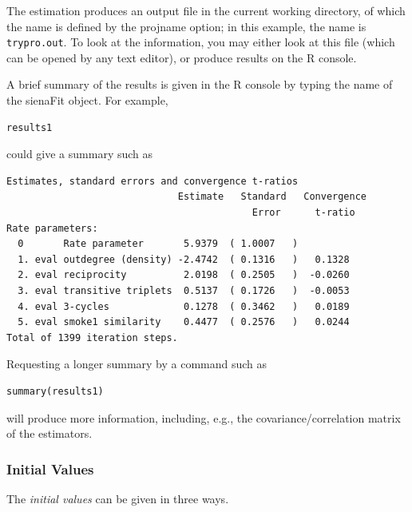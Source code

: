 \documentclass[a4paper,fleqn,11pt]{article}
\newcommand{\+}{\, + \,}
\newcommand{\R}{{\sf R }}
\begin{document}
{The estimation produces an output file in the current working directory,
of which the name is defined by the \textsf{projname} option;
in this example, the name is \texttt{trypro.out}.
To look at the information, you may either look at this file
(which can be opened by any text editor), or produce results on the \R console.

A brief summary of the results is given in the \R console by
typing the name of the  \textsf{sienaFit} object. For example,
\begin{verbatim}
results1
\end{verbatim}
could give a summary such as
\par
{\footnotesize
\begin{verbatim}
Estimates, standard errors and convergence t-ratios
                              Estimate   Standard   Convergence
                                           Error      t-ratio
Rate parameters:
  0       Rate parameter       5.9379  ( 1.0007   )
  1. eval outdegree (density) -2.4742  ( 0.1316   )   0.1328
  2. eval reciprocity          2.0198  ( 0.2505   )  -0.0260
  3. eval transitive triplets  0.5137  ( 0.1726   )  -0.0053
  4. eval 3-cycles             0.1278  ( 0.3462   )   0.0189
  5. eval smoke1 similarity    0.4477  ( 0.2576   )   0.0244
Total of 1399 iteration steps.
\end{verbatim}
}
Requesting a longer summary by a command such as
\begin{verbatim}
summary(results1)
\end{verbatim}
will produce more information, including, e.g.,
the covariance/correlation matrix of the estimators.

\subsubsection{Initial Values}
\label{S_initials}

The \emph{initial values} can be given in three ways.}
\end{document}
